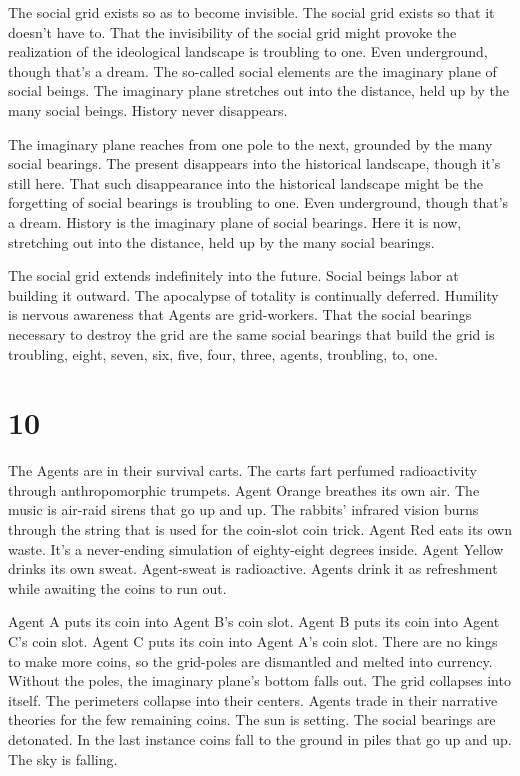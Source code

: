 \documentclass[
]{memoir}
\begin{document}
The social grid exists so as to become invisible. The social grid exists
so that it doesn't have to. That the invisibility of the social grid
might provoke the realization of the ideological landscape is troubling
to one. Even underground, though that's a dream. The so-called social
elements are the imaginary plane of social beings. The imaginary plane
stretches out into the distance, held up by the many social beings.
History never disappears.

The imaginary plane reaches from one pole to the next, grounded by the
many social bearings. The present disappears into the historical
landscape, though it's still here. That such disappearance into the
historical landscape might be the forgetting of social bearings is
troubling to one. Even underground, though that's a dream. History is
the imaginary plane of social bearings. Here it is now, stretching out
into the distance, held up by the many social bearings.

The social grid extends indefinitely into the future. Social beings
labor at building it outward. The apocalypse of totality is continually
deferred. Humility is nervous awareness that Agents are grid-workers.
That the social bearings necessary to destroy the grid are the same
social bearings that build the grid is troubling, eight, seven, six,
five, four, three, agents, troubling, to, one.

\hypertarget{section-11}{%
\section*{10}\label{section-11}}

The Agents are in their survival carts. The carts fart perfumed
radioactivity through anthropomorphic trumpets. Agent Orange breathes
its own air. The music is air-raid sirens that go up and up. The
rabbits' infrared vision burns through the string that is used for the
coin-slot coin trick. Agent Red eats its own waste. It's a never-ending
simulation of eighty-eight degrees inside. Agent Yellow drinks its own
sweat. Agent-sweat is radioactive. Agents drink it as refreshment while
awaiting the coins to run out.

Agent A puts its coin into Agent B's coin slot. Agent B puts its coin
into Agent C's coin slot. Agent C puts its coin into Agent A's coin
slot. There are no kings to make more coins, so the grid-poles are
dismantled and melted into currency. Without the poles, the imaginary
plane's bottom falls out. The grid collapses into itself. The perimeters
collapse into their centers. Agents trade in their narrative theories
for the few remaining coins. The sun is setting. The social bearings are
detonated. In the last instance coins fall to the ground in piles that
go up and up. The sky is falling.
\end{document}
